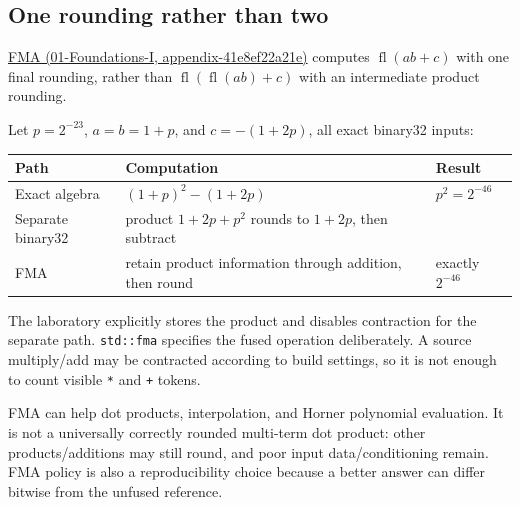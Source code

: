 \subsection{One rounding rather than two}\label{05-engine-i-ch001-one-rounding-rather-than-two}

\href{../01-Foundations-I/main.pdf\#nameddest=appendix-41e8ef22a21e}{FMA (01-Foundations-I, appendix-41e8ef22a21e)} computes \(\operatorname{fl}(ab+c)\) with one final rounding, rather than \(\operatorname{fl}(\operatorname{fl}(ab)+c)\) with an intermediate product rounding.

Let \(p=2^{-23}\), \(a=b=1+p\), and \(c=-(1+2p)\), all exact binary32 inputs:

{\def\LTcaptype{none} %
\begin{longtable}[]{@{}
  >{\raggedright\arraybackslash}p{}
  >{\raggedright\arraybackslash}p{}
  >{\raggedright\arraybackslash}p{}@{}}
\toprule\noalign{}
\begin{minipage}[b]{\linewidth}\raggedright
Path
\end{minipage} & \begin{minipage}[b]{\linewidth}\raggedright
Computation
\end{minipage} & \begin{minipage}[b]{\linewidth}\raggedright
Result
\end{minipage} \\
\midrule\noalign{}
\endhead
\bottomrule\noalign{}
\endlastfoot
Exact algebra & \((1+p)^2-(1+2p)\) & \(p^2=2^{-46}\) \\
Separate binary32 & product \(1+2p+p^2\) rounds to \(1+2p\), then subtract & 0 \\
FMA & retain product information through addition, then round & exactly \(2^{-46}\) \\
\end{longtable}
}

The laboratory explicitly stores the product and disables contraction for the separate path. \texttt{std::fma} specifies the fused operation deliberately. A source multiply/add may be contracted according to build settings, so it is not enough to count visible \texttt{*} and \texttt{+} tokens.

FMA can help dot products, interpolation, and Horner polynomial evaluation. It is not a universally correctly rounded multi-term dot product: other products/additions may still round, and poor input data/conditioning remain. FMA policy is also a reproducibility choice because a better answer can differ bitwise from the unfused reference.

